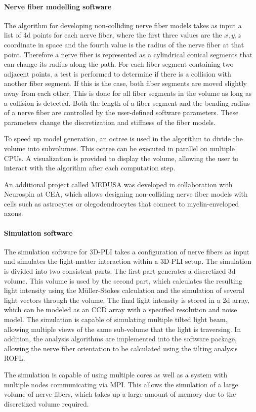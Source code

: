 \paragraph{Nerve fiber modelling software}
% 
The algorithm for developing non-colliding nerve fiber models takes as input a list of 4d points for each nerve fiber, where the first three values are the $x,y,z$ coordinate in space and the fourth value is the radius of the nerve fiber at that point.
Therefore a nerve fiber is represented as a cylindrical conical segments that can change its radius along the path.
For each fiber segment containing two adjacent points, a test is performed to determine if there is a collision with another fiber segment.
If this is the case, both fiber segments are moved slightly away from each other.
This is done for all fiber segments in the volume as long as a collision is detected.
Both the length of a fiber segment and the bending radius of a nerve fiber are controlled by the user-defined software parameters.
These parameters change the discretization and stiffness of the fiber models.
\par
% 
To speed up model generation, an octree is used in the algorithm to divide the volume into subvolumes.
This octree can be executed in parallel on multiple \acp{CPU}.
A visualization is provided to display the volume, allowing the user to interact with the algorithm after each computation step.
\par
% 
An additional project called \ac{MEDUSA} was developed in collaboration with Neurospin at \ac{CEA}, which allows designing non-colliding nerve fiber models with cells such as astrocytes or olegodendrocytes that connect to myelin-enveloped axons.
% 
% 
% 
\paragraph{Simulation software}
% 
The simulation software for \ac{3D-PLI} takes a configuration of nerve fibers as input and simulates the light-matter interaction within a \ac{3D-PLI} setup.
The simulation is divided into two consistent parts.
The first part generates a discretized 3d volume.
This volume is used by the second part, which calculates the resulting light intensity using the M\"{u}ller-Stokes calculation and the simulation of several light vectors through the volume.
The final light intensity is stored in a 2d array, which can be modeled as an \ac{CCD} array with a specified resolution and noise model.
The simulation is capable of simulating multiple tilted light beam, allowing multiple views of the same sub-volume that the light is traversing.
In addition, the analysis algorithms are implemented into the software package, allowing the nerve fiber orientation to be calculated using the tilting analysis \ac{ROFL}.
\par
% 
The simulation is capable of using multiple cores as well as a system with multiple nodes communicating via \ac{MPI}.
This allows the simulation of a large volume of nerve fibers, which takes up a large amount of memory due to the discretized volume required.
% 
% 
% 
